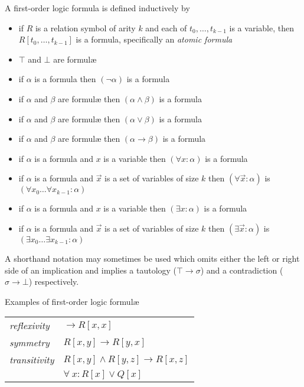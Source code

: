 		A first-order logic formula is defined inductively by
		\begin{itemize}
		\item if $R$ is a relation symbol of arity $k$ and each of $t_0 , \ldots , t_{k-1}$ is a variable, then $R[t_0,\ldots,t_{k-1}]$ is a formula, specifically an \emph{atomic formula}
		\item $\top$ and $\bot$ are formul{\ae}
		\item if $\alpha$ is a formula then $(\neg\alpha)$ is a formula
		\item if $\alpha$ and $\beta$ are formul{\ae} then $(\alpha\wedge\beta)$ is a formula
		\item if $\alpha$ and $\beta$ are formul{\ae} then $(\alpha\vee\beta)$ is a formula
		\item if $\alpha$ and $\beta$ are formul{\ae} then $(\alpha\to\beta)$ is a formula
		\item if $\alpha$ is a formula and $x$ is a variable then $(\forall x : \alpha)$ is a formula
		\item if $\alpha$ is a formula and $\vec{x}$ is a set of variables of size $k$ then $(\forall \vec{x} : \alpha)$ is $(\forall x_0 \ldots \forall x_{k-1} : \alpha)$
		\item if $\alpha$ is a formula and $x$ is a variable then $(\exists x : \alpha)$ is a formula
		\item if $\alpha$ is a formula and $\vec{x}$ is a set of variables of size $k$ then $(\exists \vec{x} : \alpha)$ is $(\exists x_0 \ldots \exists x_{k-1} : \alpha)$
		\end{itemize}

		A shorthand notation may sometimes be used which omits either the left
		or right side of an implication and implies a tautology ($\top \to
		\sigma$) and a contradiction ($\sigma \to \bot$) respectively.

		Examples of first-order logic formul{\ae}

		\begin{tabular}{ll}
		\emph{reflexivity}  \quad  &  $\to R[x,x]$                       \\
		\emph{symmetry}     \quad  &  $R[x,y] \to R[y,x]$                \\
		\emph{transitivity} \quad  &  $R[x,y] \wedge R[y,z] \to R[x,z]$  \\
		                           &  $\forall\ x : R[x] \vee Q[x]$      \\
		\end{tabular}

